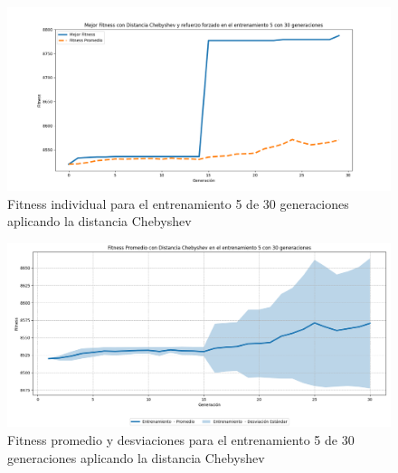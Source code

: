 \documentclass[conference]{IEEEtran}
\begin{document}

\begin{figure}[H]
    \centering
    \includegraphics[width=0.9 \linewidth]{Chebyshev/Fitness_individual_30Gen/Fitness_5_Cheby_30Gen.png}
    \caption{Fitness individual para el entrenamiento 5 de 30 generaciones aplicando la distancia Chebyshev}
    \label{fig:cheb_5_30}
\end{figure}
\begin{figure}[H]
    \centering
    \includegraphics[width=0.9 \linewidth]{Chebyshev/Fitness_individual_30Gen/Fitness_5_Cheby_30Gen_Sombra.png}
    \caption{Fitness promedio y desviaciones para el entrenamiento 5 de 30 generaciones aplicando la distancia Chebyshev}
    \label{fig:cheb_5_30_sombra}
\end{figure}
\end{document}

